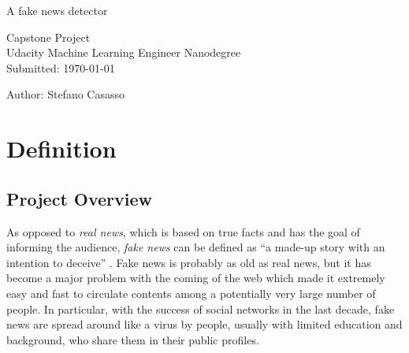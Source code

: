 \documentclass[a4paper,12pt]{article} %
\begin{document}

\begin{titlepage}

\vspace*{\fill} %

\begin{center}

{\LARGE A fake news detector}
\vspace{1.5cm}

{\large Capstone Project\\ Udacity Machine
  Learning Engineer Nanodegree}\\ [1.5cm]

Submitted: \today

\end{center}

Author: Stefano Casasso\\

\vspace*{\fill} %

\end{titlepage}


\section{Definition}


\subsection{Project Overview}
\label{sec:overview}
As opposed to \textit{real news}, which is based on true facts
and has the goal of informing the audience,
\textit{fake news} can be defined as ``a made-up story with an
intention to deceive'' \cite{NYT}.
Fake news is probably as old
as real news, but it has become a major problem with the coming of the
web which made it extremely easy and fast to circulate contents
among a potentially very large number of people. In particular, with
the success of social networks in the last decade, fake news are
spread around like a virus by people, usually with limited education and
background, who share them in their public profiles.
\end{document}
